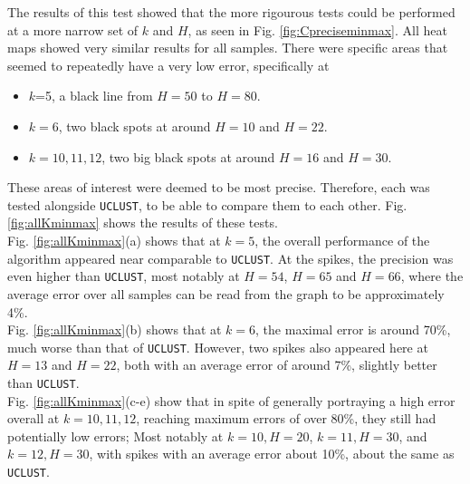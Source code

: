 \documentclass[../../main.tex]{subfiles}
\begin{document}
The results of this test showed that the more rigourous tests could be performed at a more narrow set of $k$ and $H$, as seen in Fig. \ref{fig:Cpreciseminmax}. All heat maps showed very similar results for all samples. There were specific areas that seemed to repeatedly have a very low error, specifically at
\begin{itemize}
\item $k$=5, a black line from $H=50$ to $H=80$.
\item $k=6$, two black spots at around $H=10$ and $H=22$.
\item $k=10,11,12$, two big black spots at around $H=16$ and $H=30$. 
\end{itemize}
These areas of interest were deemed to be most precise. Therefore, each was tested alongside \texttt{UCLUST}, to be able to compare them to each other. Fig. \ref{fig:allKminmax} shows the results of these tests.\\

Fig. \ref{fig:allKminmax}(a) shows that at $k=5$, the overall performance of the algorithm appeared near comparable to \texttt{UCLUST}. At the spikes, the precision was even higher than \texttt{UCLUST}, most notably at $H=54$, $H=65$ and $H=66$, where the average error over all samples can be read from the graph to be approximately 4\%.\\ 

Fig. \ref{fig:allKminmax}(b) shows that at $k=6$, the maximal error is around 70\%, much worse than that of \texttt{UCLUST}. However, two spikes also appeared here at $H=13$ and $H=22$, both with an average error of around 7\%, slightly better than \texttt{UCLUST}.\\

Fig. \ref{fig:allKminmax}(c-e) show that in spite of generally portraying a high error overall at $k=10,11,12$, reaching maximum errors of over 80\%, they still had potentially low errors; Most notably at $k=10,H=20$, $k=11,H=30$, and $k=12,H=30$, with spikes with an average error about 10\%, about the same as \texttt{UCLUST}.\\
\end{document}
